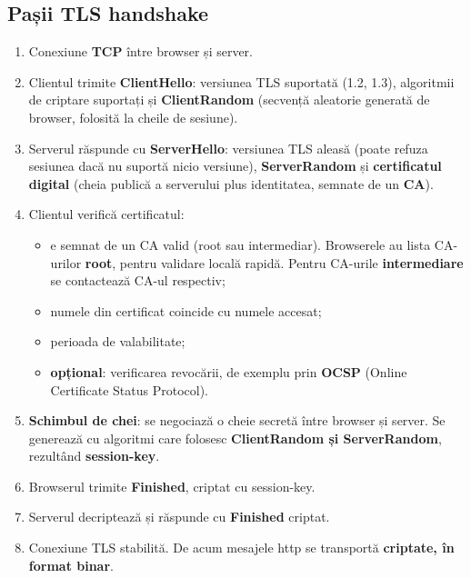 \documentclass[11pt,a4paper]{article}
\begin{document}
\subsection*{Pașii TLS handshake}
\begin{enumerate}
  \item Conexiune \textbf{TCP} între browser și server.
  \item Clientul trimite \textbf{ClientHello}: versiunea TLS suportată (1.2, 1.3), algoritmii de criptare suportați și \textbf{ClientRandom} (secvență aleatorie generată de browser, folosită la cheile de sesiune).
  \item Serverul răspunde cu \textbf{ServerHello}: versiunea TLS aleasă (poate refuza sesiunea dacă nu suportă nicio versiune), \textbf{ServerRandom} și \textbf{certificatul digital} (cheia publică a serverului plus identitatea, semnate de un \textbf{CA}).
  \item Clientul verifică certificatul:
  \begin{itemize}
    \item e semnat de un CA valid (root sau intermediar). Browserele au lista CA-urilor \textbf{root}, pentru validare locală rapidă. Pentru CA-urile \textbf{intermediare} se contactează CA-ul respectiv;
    \item numele din certificat coincide cu numele accesat;
    \item perioada de valabilitate;
    \item \textbf{opțional}: verificarea revocării, de exemplu prin \textbf{OCSP} (Online Certificate Status Protocol).
  \end{itemize}
  \item \textbf{Schimbul de chei}: se negociază o cheie secretă între browser și server. Se generează cu algoritmi care folosesc \textbf{ClientRandom și ServerRandom}, rezultând \textbf{session-key}.
  \item Browserul trimite \textbf{Finished}, criptat cu session-key.
  \item Serverul decriptează și răspunde cu \textbf{Finished} criptat.
  \item Conexiune TLS stabilită. De acum mesajele http se transportă \textbf{criptate, în format binar}.
\end{enumerate}

\end{document}
